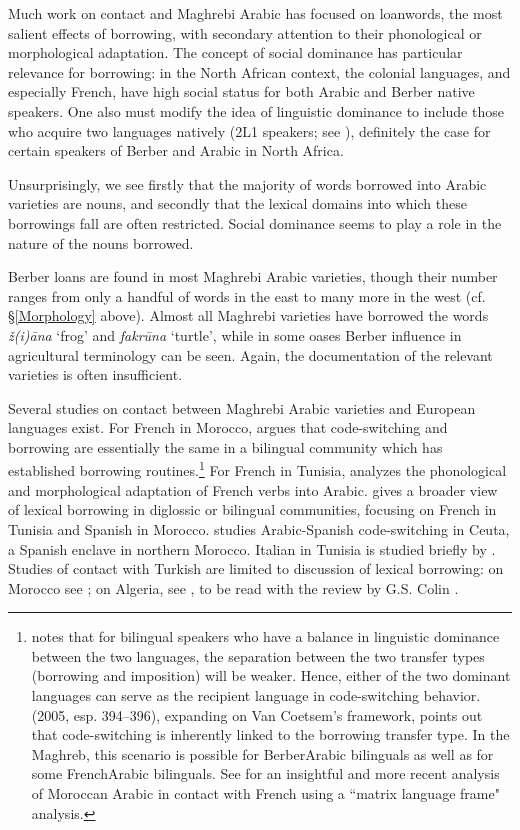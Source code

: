 \documentclass[output=paper]{langsci/langscibook}
\begin{document}
Much work on contact and Maghrebi Arabic has focused on loanwords, the most salient effects of borrowing, with secondary attention to their phonological or morphological adaptation. The concept of social dominance has particular relevance for borrowing: in the North African context, the colonial languages, and especially French, have high social status for both Arabic and Berber native speakers. One also must modify the idea of linguistic dominance to include those who acquire two languages natively (2L1 speakers; see \citealt[525]{Lucas2015}), definitely the case for certain speakers of Berber and Arabic in North Africa. 

  Unsurprisingly, we see firstly that the majority of words borrowed into Arabic varieties are nouns, and secondly that the lexical domains into which these borrowings fall are often restricted. Social dominance seems to play a role in the nature of the nouns borrowed.

  Berber loans are found in most Maghrebi Arabic varieties, though their number ranges from only a handful of words in the east to many more in the west (cf. §\ref{Morphology} above). Almost all Maghrebi varieties have borrowed the words \textit{ž(i){\R}āna} ‘frog’ and \textit{fakrūna} ‘turtle’, while in some oases Berber influence in agricultural terminology can be seen. Again, the documentation of the relevant varieties is often insufficient.

Several studies on contact between Maghrebi Arabic varieties and European languages exist. For French in Morocco, \citet{Heath1989} argues that code-switching and borrowing are essentially the same in a bilingual community which has established borrowing routines.\footnote{\citet[87]{VanCoetsem1988} notes that for bilingual speakers who have a balance in linguistic dominance between the two languages, the separation between the two transfer types (borrowing and imposition) will be weaker. Hence, either of the two dominant languages can serve as the recipient language in code-switching behavior. \citeauthor{Winford2005} (2005, esp. 394–396), expanding on Van Coetsem’s framework, points out that code-switching is inherently linked to the borrowing transfer type. In the Maghreb, this scenario is possible for Berber\textendash Arabic bilinguals as well as for some French\textendash Arabic bilinguals. See \citet{Ziamari2008} for an insightful and more recent analysis of Moroccan Arabic in contact with French using a ``matrix language frame" analysis.} For French in Tunisia, \citet{Talmoudi1986} analyzes the phonological and morphological adaptation of French verbs into Arabic. \citet[127–151]{Sayahi2014} gives a broader view of lexical borrowing in diglossic or bilingual communities, focusing on French in Tunisia and Spanish in Morocco. \citet{Vicente2005} studies Arabic-Spanish code-switching in Ceuta, a Spanish enclave in northern Morocco. Italian in Tunisia is studied briefly by \citet{Cifoletti1994}. Studies of contact with Turkish are limited to discussion of lexical borrowing: on Morocco see \citet{Procházka2012}; on Algeria, see \citet{BenCheneb1922}, to be read with the review by G.S. Colin \citep[21–30]{Colin1999}.
\end{document}
